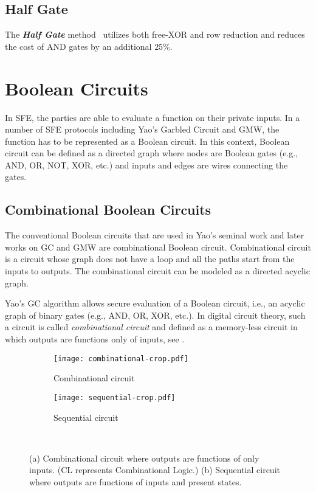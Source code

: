 \subsection{Half Gate~\cite{zahur2015two}}
The \textbf{\textit{Half Gate}} method~\cite{zahur2015two} utilizes both free-XOR and row reduction and reduces the cost of AND gates by an additional $25\%$.

\section{Boolean Circuits}
In SFE, the parties are able to evaluate a function on their private inputs.
In a number of SFE protocols including Yao's Garbled Circuit and GMW, the function has to be represented as a Boolean circuit.
In this context, Boolean circuit can be defined as a directed graph where nodes are Boolean gates (e.g., AND, OR, NOT, XOR, etc.) and inputs and edges are wires connecting the gates.

\subsection{Combinational Boolean Circuits}
The conventional Boolean circuits that are used in Yao's seminal work and later works on GC and GMW are combinational Boolean circuit.
Combinational circuit is a circuit whose graph does not have a loop and all the paths start from the inputs to outputs.
The combinational circuit can be modeled as a directed acyclic graph.

Yao's GC algorithm allows secure evaluation of a Boolean circuit, i.e., an acyclic graph of binary gates (e.g., AND, OR, XOR, etc.).
In digital circuit theory, such a circuit is called \emph{combinational circuit} and defined as a memory-less circuit in which outputs are functions only of inputs, see .

\begin{figure}[ht]
    \centering
    \begin{subfigure}[t]{0.35\textwidth}
        \texttt{[image: combinational-crop.pdf]}
        \caption{Combinational circuit}\label{fig:combinational}
    \end{subfigure}
    \begin{subfigure}[t]{0.30\textwidth}
        \texttt{[image: sequential-crop.pdf]}
        \caption{Sequential circuit}\label{fig:sequential}
    \end{subfigure}\\
    \caption{(a) Combinational circuit where outputs are functions of only inputs. (CL represents Combinational Logic.)
    (b) Sequential circuit where outputs are functions of inputs and present states.
    }
\end{figure}

